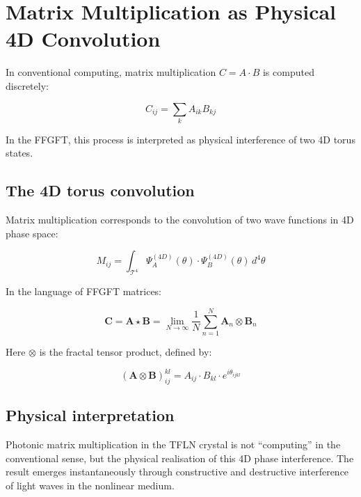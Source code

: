 	\section{Matrix Multiplication as Physical 4D Convolution}
	
	In conventional computing, matrix multiplication $C = A \cdot B$ is computed discretely:
	
	\begin{equation}
		C_{ij} = \sum_{k} A_{ik} B_{kj}
	\end{equation}
	
	In the FFGFT, this process is interpreted as physical interference of two 4D torus states.
	
	\subsection{The 4D torus convolution}
	
	Matrix multiplication corresponds to the convolution of two wave functions in 4D phase space:
	
	\begin{equation}
		M_{ij} = \int_{\mathcal{T}^4} \Psi_A^{(4D)}(\theta) \cdot \Psi_B^{(4D)}(\theta) \, d^4\theta
	\end{equation}
	
	In the language of FFGFT matrices:
	
	\begin{equation}
		\mathbf{C} = \mathbf{A} \star \mathbf{B} = \lim_{N \to \infty} \frac{1}{N} \sum_{n=1}^{N} \mathbf{A}_n \otimes \mathbf{B}_n
	\end{equation}
	
	Here $\otimes$ is the fractal tensor product, defined by:
	
	\begin{equation}
		(\mathbf{A} \otimes \mathbf{B})_{ij}^{kl} = A_{ij} \cdot B_{kl} \cdot e^{i \theta_{ijkl}}
	\end{equation}
	
	\subsection{Physical interpretation}
	
	Photonic matrix multiplication in the TFLN crystal is not ``computing'' in the conventional sense, but the physical realisation of this 4D phase interference. The result emerges instantaneously through constructive and destructive interference of light waves in the nonlinear medium.
	
